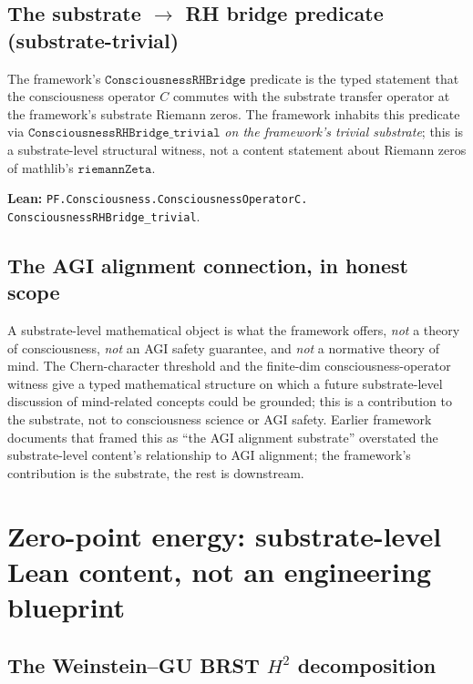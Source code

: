\documentclass[11pt,a4paper]{article}
\theoremstyle{plain}
\theoremstyle{definition}
\begin{document}
\subsection{The substrate $\to$ RH bridge predicate (substrate-trivial)}
\label{sec:c-rh-bridge}

The framework's $\mathtt{ConsciousnessRHBridge}$ predicate is the
typed statement that the consciousness operator $C$ commutes with
the substrate transfer operator at the framework's substrate Riemann
zeros. The framework inhabits this predicate via
$\mathtt{ConsciousnessRHBridge\_trivial}$ \emph{on the framework's
trivial substrate}; this is a substrate-level structural witness, not
a content statement about Riemann zeros of mathlib's
$\mathtt{riemannZeta}$.

\textbf{Lean:}
\texttt{PF.Consciousness.ConsciousnessOperatorC.\\
ConsciousnessRHBridge\_trivial}.

\subsection{The AGI alignment connection, in honest scope}
\label{sec:agi-alignment}

A substrate-level mathematical object is what the framework offers,
\emph{not} a theory of consciousness, \emph{not} an AGI safety
guarantee, and \emph{not} a normative theory of mind. The Chern-character
threshold and the finite-dim consciousness-operator witness give a
typed mathematical structure on which a future substrate-level
discussion of mind-related concepts could be grounded; this is a
contribution to the substrate, not to consciousness science or AGI
safety. Earlier framework documents that framed this as ``the AGI
alignment substrate'' overstated the substrate-level content's
relationship to AGI alignment; the framework's contribution is the
substrate, the rest is downstream.

\section{Zero-point energy: substrate-level Lean content, not an
engineering blueprint}
\label{sec:zpe}

\subsection{The Weinstein--GU BRST $H^{2}$ decomposition}
\label{sec:brst-decomposition}
\end{document}
